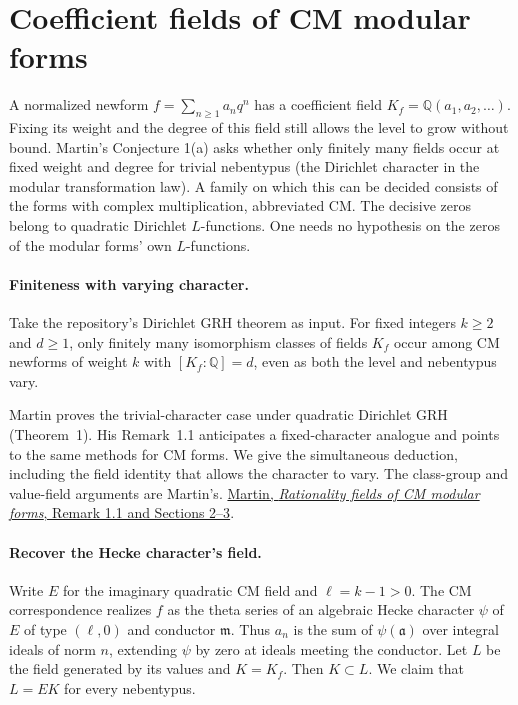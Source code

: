 \section{Coefficient fields of CM modular forms}
\label{sec:cm}
A normalized newform $f=\sum_{n\geq1}a_nq^n$ has a coefficient field
$K_f=\mathbb Q(a_1,a_2,\ldots)$. Fixing its weight and the degree of this
field still allows the level to grow without bound. Martin's Conjecture
1(a) asks whether only finitely many fields occur at fixed weight and
degree for trivial nebentypus (the Dirichlet character in the modular
transformation law). A family on which this can be decided consists of
the forms with complex multiplication, abbreviated CM. The decisive
zeros belong to quadratic Dirichlet $L$-functions. One needs no
hypothesis on the zeros of the modular forms' own $L$-functions.

\paragraph{Finiteness with varying character.}
Take the repository's Dirichlet GRH theorem as input. For fixed integers
$k\geq2$ and $d\geq1$, only finitely many isomorphism classes of fields
$K_f$ occur among CM newforms of weight $k$ with
$[K_f:\mathbb Q]=d$, even as both the level and nebentypus vary.

Martin proves the trivial-character case under quadratic Dirichlet GRH
(Theorem~1). His Remark~1.1 anticipates a fixed-character analogue and
points to the same methods for CM forms. We give the simultaneous
deduction, including the field identity that allows the character to
vary. The class-group and value-field arguments are Martin's.
\href{https://arxiv.org/pdf/2509.24119v2}{Martin, \emph{Rationality fields of CM modular forms}, Remark 1.1 and Sections 2--3}.

\paragraph{Recover the Hecke character's field.}
Write $E$ for the imaginary quadratic CM field and $\ell=k-1>0$.
The CM correspondence realizes $f$ as the theta series of an algebraic
Hecke character $\psi$ of $E$ of type $(\ell,0)$ and conductor
$\mathfrak m$. Thus $a_n$ is the sum of $\psi(\mathfrak a)$ over integral
ideals of norm $n$, extending $\psi$ by zero at ideals meeting the
conductor. Let $L$ be the field generated by its values and $K=K_f$.
Then $K\subset L$. We claim that $L=EK$ for every nebentypus.

